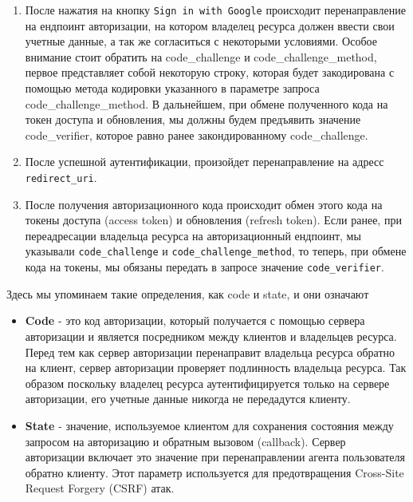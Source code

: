 \begin{enumerate}
    \item После нажатия на кнопку \texttt{Sign in with Google} происходит перенаправление на ендпоинт авторизации,
    на котором владелец ресурса должен ввести свои учетные данные, а так же согласиться с некоторыми условиями.
    Особое внимание стоит обратить на code\_challenge и code\_challenge\_method, первое представляет собой некоторую строку,
    которая будет закодирована с помощью метода кодировки указанного в параметре запроса code\_challenge\_method.
    В дальнейшем, при обмене полученного кода на токен доступа и обновления, мы должны будем предъявить значение code\_verifier,
    которое равно ранее закондированному code\_challenge.
    \item После успешной аутентификации, произойдет перенаправление на адресс \texttt{redirect\_uri}.
    \item После получения авторизационного кода происходит обмен этого кода на токены доступа (access token) и обновления (refresh token).
    Если ранее, при переадресации владельца ресурса на авторизационный ендпоинт, мы указывали \texttt{code\_challenge} и \texttt{code\_challenge\_method},
    то теперь, при обмене кода на токены, мы обязаны передать в запросе значение \texttt{code\_verifier}.
\end{enumerate}
Здесь мы упоминаем такие определения, как code и state, и они означают
\begin{itemize}
    \item \textbf{Code} - это код авторизации, который получается с помощью сервера авторизации и является посредником между клиентов и владельцев ресурса.
    Перед тем как сервер авторизации перенаправит владельца ресурса обратно на клиент, сервер авторизации проверяет подлинность владельца ресурса.
    Так образом поскольку владелец ресурса аутентифицируется только на сервере авторизации, его учетные данные никогда не передадутся клиенту.
    \item \textbf{State} - значение, используемое клиентом для сохранения состояния между запросом на авторизацию и обратным вызовом (callback).
    Сервер авторизации включает это значение при перенаправлении агента пользователя обратно клиенту.
    Этот параметр используется для предотвращения Cross-Site Request Forgery (CSRF) атак.
\end{itemize}

